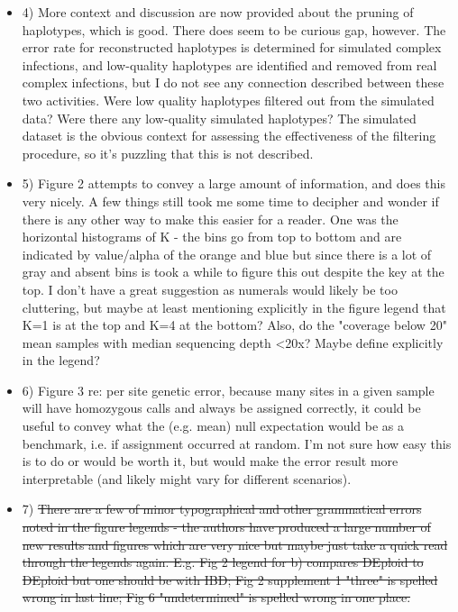 \documentclass[11pt,twoside,a4paper]{article}
\begin{document}
\begin{itemize}
    \item 4) More context and discussion are now provided about the pruning of haplotypes, which is good. There does seem to be curious gap, however. The error rate for reconstructed haplotypes is determined for simulated complex infections, and low-quality haplotypes are identified and removed from real complex infections, but I do not see any connection described between these two activities. Were low quality haplotypes filtered out from the simulated data? Were there any low-quality simulated haplotypes? The simulated dataset is the obvious context for assessing the effectiveness of the filtering procedure, so it's puzzling that this is not described.

    \item 5) Figure 2 attempts to convey a large amount of information, and does this very nicely. A few things still took me some time to decipher and wonder if there is any other way to make this easier for a reader. One was the horizontal histograms of K - the bins go from top to bottom and are indicated by value/alpha of the orange and blue but since there is a lot of gray and absent bins is took a while to figure this out despite the key at the top. I don't have a great suggestion as numerals would likely be too cluttering, but maybe at least mentioning explicitly in the figure legend that K=1 is at the top and K=4 at the bottom? Also, do the "coverage below 20" mean samples with median sequencing depth <20x? Maybe define explicitly in the legend?

    \item 6) Figure 3 re: per site genetic error, because many sites in a given sample will have homozygous calls and always be assigned correctly, it could be useful to convey what the (e.g. mean) null expectation would be as a benchmark, i.e. if assignment occurred at random. I'm not sure how easy this is to do or would be worth it, but would make the error result more interpretable (and likely might vary for different scenarios).

    \item 7) \st{There are a few of minor typographical and other grammatical errors noted in the figure legends - the authors have produced a large number of new results and figures which are very nice but maybe just take a quick read through the legends again. E.g. Fig 2 legend for b) compares DEploid to DEploid but one should be with IBD; Fig 2 supplement 1 "three" is spelled wrong in last line; Fig 6 "undetermined" is spelled wrong in one place.}


\end{itemize}
\end{document}
